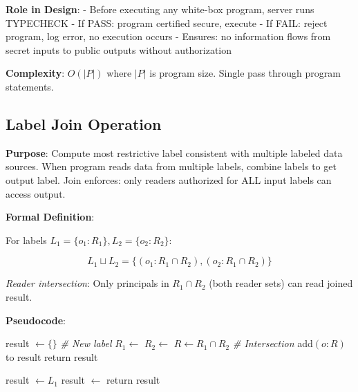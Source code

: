 \textbf{Role in Design}: 
- Before executing any white-box program, server runs TYPECHECK
- If PASS: program certified secure, execute
- If FAIL: reject program, log error, no execution occurs
- Ensures: no information flows from secret inputs to public outputs without authorization

\textbf{Complexity}: $O(|P|)$ where $|P|$ is program size. Single pass through program statements.

\subsection{Label Join Operation}

\textbf{Purpose}: Compute most restrictive label consistent with multiple labeled data sources. When program reads data from multiple labels, combine labels to get output label. Join enforces: only readers authorized for ALL input labels can access output.

\textbf{Formal Definition}:

For labels $L_1 = \{o_1: R_1\}, L_2 = \{o_2: R_2\}$:

\begin{equation}
L_1 \sqcup L_2 = \{(o_1: R_1 \cap R_2), (o_2: R_1 \cap R_2)\}
\end{equation}

\textit{Reader intersection}: Only principals in $R_1 \cap R_2$ (both reader sets) can read joined result.

\textbf{Pseudocode}:

\begin{algorithmic}
  \State result $\gets \{\}$ \textit{\# New label}
    \State $R_1 \gets$ 
    \State $R_2 \gets$ 
    \State $R \gets R_1 \cap R_2$ \textit{\# Intersection}
    \State add$(o: R)$ to result
  \EndFor
  \State return result
\EndFunction

  \State result $\gets L_1$
    \State result $\gets$ 
  \EndFor
  \State return result
\EndFunction
\end{algorithmic}


